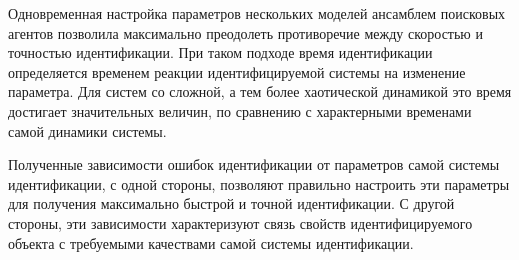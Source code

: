 \documentclass[a4paper,paratype,12pt,fouriernc]{cmonogra}
\begin{document}
Одновременная настройка параметров нескольких моделей ансамблем поисковых агентов
позволила максимально преодолеть противоречие между скоростью и точностью
идентификации. При таком подходе время идентификации определяется
временем реакции идентифицируемой системы на изменение параметра.
Для систем со сложной, а тем более хаотической динамикой это время достигает
значительных величин, по сравнению с характерными временами самой динамики системы.


Полученные зависимости ошибок идентификации от параметров
самой системы идентификации, с одной стороны, позволяют
правильно настроить эти параметры для получения максимально быстрой
и точной идентификации. С другой стороны, эти зависимости
характеризуют связь свойств идентифицируемого объекта с
требуемыми качествами самой системы идентификации.


\printbibliography
\label{e:atu}{~}

\FloatBarrier
\end{document}
